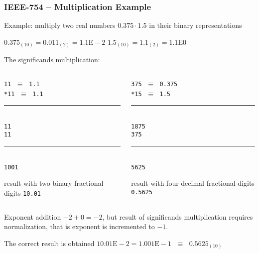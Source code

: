 \documentclass{beamer}
\begin{document}
\begin{frame}
\frametitle{IEEE-754 -- Multiplication Example}

Example: multiply two real numbers $0.375 \cdot 1.5$ in their binary representations

$0.375_{(10)} = 0.011_{(2)} = 1.1\text{E}-2$ \phantom{xxx} $1.5_{(10)} = 1.1_{(2)} = 1.1\text{E}0$

The significands multiplication:\\
\begin{columns}
\begin{column}{0.45\textwidth}
\texttt{\phantom{xxx}11} $\;\equiv\;$ \texttt{1.1}\\
\texttt{\phantom{xx}*11} $\;\equiv\;$ \texttt{1.1}\vspace{-6pt}\\
\rule[0pt]{2cm}{0.4pt}\\
\texttt{\phantom{xxx}11}\\
\texttt{\phantom{xx}11}\vspace{-6pt}\\
\rule[0pt]{2cm}{0.4pt}\\
\texttt{\phantom{x}1001} 

result with two binary fractional digits \texttt{10.01}
\end{column}
\hfill
\begin{column}{0.45\textwidth}
\texttt{\phantom{xx}375} $\;\equiv\;$ \texttt{0.375}\\
\texttt{\phantom{xx}*15} $\;\equiv\;$ \texttt{1.5}\vspace{-6pt}\\
\rule[0pt]{2cm}{0.4pt}\\
\texttt{\phantom{x}1875}\\
\texttt{\phantom{x}375}\vspace{-6pt}\\
\rule[0pt]{2cm}{0.4pt}\\
\texttt{\phantom{x}5625} 

result with four decimal fractional digits \texttt{0.5625}
\end{column}
\end{columns}
\bigskip

Exponent addition $-2+0=-2$, but result of significands multiplication requires normalization, that is exponent is incremented to $-1$.

The correct result is obtained $10.01\text{E}-2 = 1.001\text{E}-1$ $\;\equiv\;$ $0.5625_{(10)}$

\end{frame}
\end{document}
